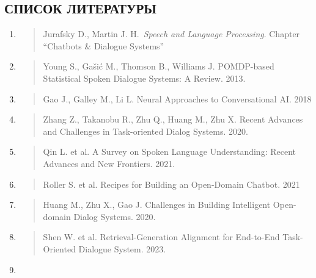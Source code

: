\documentclass[
]{article}
\begin{document}
\hypertarget{ux441ux43fux438ux441ux43eux43a-ux43bux438ux442ux435ux440ux430ux442ux443ux440ux44b}{%
\subsection{СПИСОК
ЛИТЕРАТУРЫ}\label{ux441ux43fux438ux441ux43eux43a-ux43bux438ux442ux435ux440ux430ux442ux443ux440ux44b}}

\begin{enumerate}
\def\labelenumi{\arabic{enumi}.}
\item
  \begin{quote}
  Jurafsky D., Martin J. H.~\emph{Speech and Language Processing}.
  Chapter ``Chatbots \& Dialogue Systems''
  \end{quote}
\item
  \begin{quote}
  Young S., Gašić M., Thomson B., Williams J. POMDP-based Statistical
  Spoken Dialogue Systems: A Review. 2013.
  \end{quote}
\item
  \begin{quote}
  Gao J., Galley M., Li L. Neural Approaches to Conversational AI. 2018
  \end{quote}
\item
  \begin{quote}
  Zhang Z., Takanobu R., Zhu Q., Huang M., Zhu X. Recent Advances and
  Challenges in Task-oriented Dialog Systems. 2020.
  \end{quote}
\item
  \begin{quote}
  Qin L. et al. A Survey on Spoken Language Understanding: Recent
  Advances and New Frontiers. 2021.
  \end{quote}
\item
  \begin{quote}
  Roller S. et al. Recipes for Building an Open-Domain Chatbot. 2021
  \end{quote}
\item
  \begin{quote}
  Huang M., Zhu X., Gao J. Challenges in Building Intelligent
  Open-domain Dialog Systems. 2020.
  \end{quote}
\item
  \begin{quote}
  Shen W. et al. Retrieval-Generation Alignment for End-to-End
  Task-Oriented Dialogue System. 2023.
  \end{quote}
\item
  \begin{quote}

\end{quote}
\end{enumerate}
\end{document}
